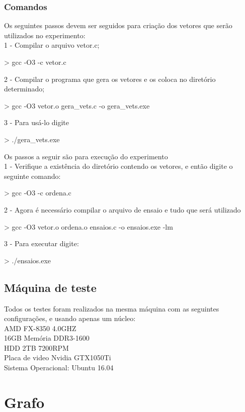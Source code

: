 \documentclass[12pt,a4paper,twoside]{report}
\begin{document}
\subsection{Comandos}
Os seguintes passos devem ser seguidos para criação dos vetores que serão utilizados no experimento:\\
1 - Compilar o arquivo vetor.c;
\begin{terminal}
    > gcc -O3 -c vetor.c
\end{terminal}
2 - Compilar o programa que gera os vetores e os coloca no diretório determinado;
\begin{terminal}
    > gcc -O3 vetor.o gera_vets.c -o gera_vets.exe
\end{terminal}
3 - Para usá-lo digite
\begin{terminal}
    > ./gera_vets.exe
\end{terminal}

Os passos a seguir são para execução do experimento\\
1 - Verifique a existência do diretório contendo os vetores, e então digite o seguinte comando:
\begin{terminal}
    > gcc -O3 -c ordena.c
\end{terminal}
2 - Agora é necessário compilar o arquivo de ensaio e tudo que será utilizado
\begin{terminal}
    > gcc -O3 vetor.o ordena.o ensaios.c -o ensaios.exe -lm
\end{terminal}
3 - Para executar digite:
\begin{terminal}
    > ./ensaios.exe
\end{terminal}

\section{Máquina de teste}
Todos os testes foram realizados na mesma máquina com as seguintes configurações, e usando apenas um núcleo:\\
AMD FX-8350 4.0GHZ\\
16GB Memória DDR3-1600\\
HDD 2TB 7200RPM\\
Placa de video Nvidia GTX1050Ti\\
Sistema Operacional: Ubuntu 16.04\\

\chapter{Grafo}
\end{document}
